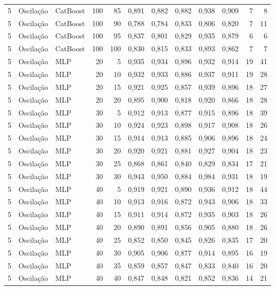 \begin{longtable}{@{}rllrrrrrrrrr@{}}
5 & Oscilação & CatBoost & 100 & 85 & 0,891 & 0,882 & 0,882 & 0,938 & 0,909 & 7 & 8 \\
5 & Oscilação & CatBoost & 100 & 90 & 0,788 & 0,784 & 0,833 & 0,806 & 0,820 & 7 & 11 \\
5 & Oscilação & CatBoost & 100 & 95 & 0,837 & 0,801 & 0,829 & 0,935 & 0,879 & 6 & 6 \\
5 & Oscilação & CatBoost & 100 & 100 & 0,830 & 0,815 & 0,833 & 0,893 & 0,862 & 7 & 7 \\
5 & Oscilação & MLP & 20 & 5 & 0,935 & 0,934 & 0,896 & 0,932 & 0,914 & 19 & 41 \\
5 & Oscilação & MLP & 20 & 10 & 0,932 & 0,933 & 0,886 & 0,937 & 0,911 & 19 & 28 \\
5 & Oscilação & MLP & 20 & 15 & 0,921 & 0,925 & 0,857 & 0,939 & 0,896 & 18 & 27 \\
5 & Oscilação & MLP & 20 & 20 & 0,895 & 0,900 & 0,818 & 0,920 & 0,866 & 18 & 28 \\
5 & Oscilação & MLP & 30 & 5 & 0,912 & 0,913 & 0,877 & 0,915 & 0,896 & 18 & 39 \\
5 & Oscilação & MLP & 30 & 10 & 0,924 & 0,923 & 0,898 & 0,917 & 0,908 & 18 & 26 \\
5 & Oscilação & MLP & 30 & 15 & 0,914 & 0,913 & 0,885 & 0,906 & 0,896 & 18 & 24 \\
5 & Oscilação & MLP & 30 & 20 & 0,920 & 0,921 & 0,881 & 0,927 & 0,904 & 18 & 23 \\
5 & Oscilação & MLP & 30 & 25 & 0,868 & 0,861 & 0,840 & 0,829 & 0,834 & 17 & 21 \\
5 & Oscilação & MLP & 30 & 30 & 0,943 & 0,950 & 0,884 & 0,984 & 0,931 & 18 & 19 \\
5 & Oscilação & MLP & 40 & 5 & 0,919 & 0,921 & 0,890 & 0,936 & 0,912 & 18 & 44 \\
5 & Oscilação & MLP & 40 & 10 & 0,913 & 0,916 & 0,872 & 0,943 & 0,906 & 18 & 33 \\
5 & Oscilação & MLP & 40 & 15 & 0,911 & 0,914 & 0,872 & 0,935 & 0,903 & 18 & 26 \\
5 & Oscilação & MLP & 40 & 20 & 0,890 & 0,891 & 0,856 & 0,905 & 0,880 & 18 & 26 \\
5 & Oscilação & MLP & 40 & 25 & 0,852 & 0,850 & 0,845 & 0,826 & 0,835 & 17 & 20 \\
5 & Oscilação & MLP & 40 & 30 & 0,905 & 0,906 & 0,877 & 0,914 & 0,895 & 16 & 19 \\
5 & Oscilação & MLP & 40 & 35 & 0,859 & 0,857 & 0,847 & 0,833 & 0,840 & 16 & 20 \\
5 & Oscilação & MLP & 40 & 40 & 0,847 & 0,848 & 0,821 & 0,852 & 0,836 & 14 & 21 \\

\end{longtable}
